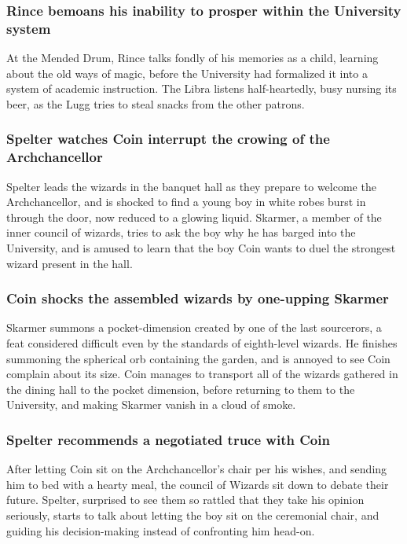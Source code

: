 \subsubsection{\Gls{Rince} bemoans his inability to prosper within the University system}
At the Mended Drum, \Gls{Rince} talks fondly of his memories as a child, learning about the old
ways of magic, before the University had formalized it into a system of academic instruction.
The \Gls{Libra} listens half-heartedly, busy nursing its beer, as the \Gls{Lugg} tries to steal
snacks from the other patrons.

\subsubsection{\Gls{Spelter} watches \Gls{Coin} interrupt the crowing of the Archchancellor}
\Gls{Spelter} leads the wizards in the banquet hall as they prepare to welcome the Archchancellor,
and is shocked to find a young boy in white robes burst in through the door, now reduced to a
glowing liquid. \Gls{Skarmer}, a member of the inner council of wizards, tries to ask the boy why
he has barged into the University, and is amused to learn that the boy \Gls{Coin} wants to duel the
strongest wizard present in the hall.

\subsubsection{\Gls{Coin} shocks the assembled wizards by one-upping \Gls{Skarmer}}
\Gls{Skarmer} summons a pocket-dimension created by one of the last sourcerors, a feat considered
difficult even by the standards of eighth-level wizards. He finishes summoning the spherical
orb containing the garden, and is annoyed to see \Gls{Coin} complain about its size. \Gls{Coin}
manages to transport all of the wizards gathered in the dining hall to the pocket dimension, before
returning to them to the University, and making \Gls{Skarmer} vanish in a cloud of smoke.

\subsubsection{\Gls{Spelter} recommends a negotiated truce with \Gls{Coin}}
After letting \Gls{Coin} sit on the Archchancellor's chair per his wishes, and sending him to bed
with a hearty meal, the council of Wizards sit down to debate their future. \Gls{Spelter}, surprised
to see them so rattled that they take his opinion seriously, starts to talk about letting the boy
sit on the ceremonial chair, and guiding his decision-making instead of confronting him head-on.

